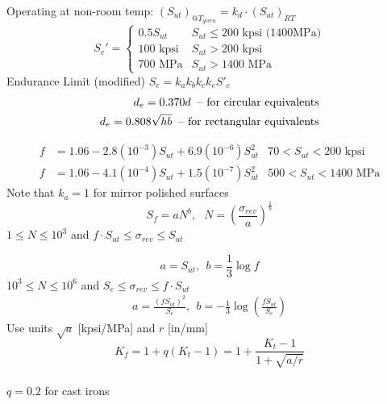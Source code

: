 Operating at non-room temp: 
$ (S_{ut})_{@T_{given}} = k_d \cdot (S_{ut})_{RT}$\\
        \[S_e'= \begin{cases} 
              0.5S_{ut} & S_{ut}\leq 200 \text{ kpsi (1400MPa)}\\
              100\text{ kpsi} & S_{ut} > 200\text{ kpsi} \\
              700\text{ MPa} & S_{ut} > 1400\text{ MPa}  
           \end{cases}
        \]
\vspace{-3pt}
Endurance Limit (modified)\;\; $S_e = k_a k_b k_c k_e S'_e$\\

\vspace{-10pt}
\begin{align*}
    d_e = 0.370d \text{\;\;-- for circular equivalents}\\
    d_e = 0.808\sqrt{hb} \text{\;\;-- for rectangular equivalents}
\end{align*}

\vspace{-10pt}
\begin{align*}
    f&=1.06-2.8(10^{-3})S_{ut}+6.9(10^{-6})S_{ut}^2 &70<S_{ut} < 200\text{ kpsi}\\
    f&=1.06-4.1(10^{-4})S_{ut}+1.5(10^{-7})S_{ut}^2 &500<S_{ut} < 1400\text{ MPa}
\end{align*}
Note that $k_a=1$ for mirror polished surfaces\\
\vspace{-5pt}
\begin{equation*}
    S_f = aN^b,\ \hspace{5pt} N = \left(\frac{\sigma_{rev}}{a}\right)^\frac{1}{b}
\end{equation*}
\vspace{-3pt}
 $1\leq N \leq 10^3$ and $f \cdot S_{ut}\leq \sigma_{rev} \leq S_{ut}$
\vspace{-5pt}

\begin{equation*}
    a=S_{ut},\ \ b= \frac{1}{3}\log f
\end{equation*}
$10^3\leq N \leq 10^6$ and $S_e \leq \sigma_{rev} \leq f \cdot S_{ut}$
\vspace{-5pt}
\begin{align*}
    a=\frac{(fS_{ut})^2}{S_e}, \ \ b=-\frac{1}{3}\log\left(\frac{fS_{ut}}{S_e}\right)
\end{align*}
Use units $\sqrt a$ [kpsi/MPa] and $r$ [in/mm]\vspace{-7pt}
 \begin{equation*}
     K_f = 1+q(K_t-1) = 1+\frac{K_t-1}{1+\sqrt{a/r}}
 \end{equation*}\\ \vspace{-6pt}
$q=0.2$ for cast irons

